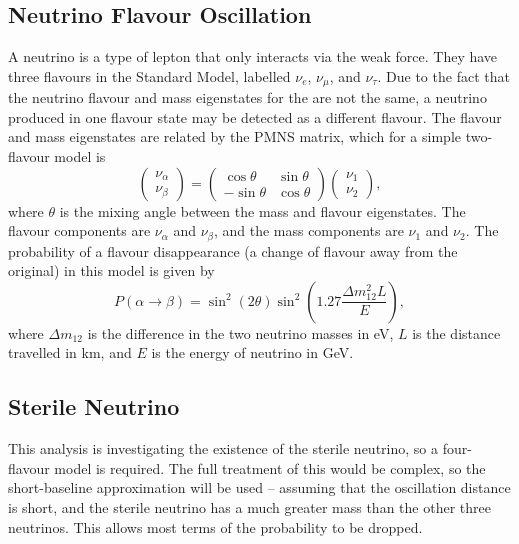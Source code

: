 \documentclass[reprint,
    nofootinbib,
    amsmath,amssymb,
    aps,
    10pt,
    nolongbibliography,
]{revtex4-2}
\begin{document}
\subsection{Neutrino Flavour Oscillation}

A neutrino is a type of lepton that only interacts via the weak force. They have three flavours in
the Standard Model, labelled $\nu_e$, $\nu_\mu$, and $\nu_\tau$. Due to the fact that the neutrino
flavour and mass eigenstates for the are not the same, a neutrino produced in one flavour state may be
detected as a different flavour. The flavour and mass eigenstates are related by the PMNS matrix\cite{pmns}, 
which for a simple two-flavour model is
\begin{equation}
    \begin{pmatrix}
        \nu_\alpha \\ \nu_\beta
    \end{pmatrix}
    = \begin{pmatrix}
        \cos{\theta} & \sin{\theta} \\
        -\sin{\theta} & \cos{\theta}
    \end{pmatrix} \begin{pmatrix}
        \nu_1 \\ \nu_2
    \end{pmatrix},
\end{equation}
where $\theta$ is the mixing angle between the mass and flavour eigenstates. The flavour components
are $\nu_\alpha$ and $\nu_\beta$, and the mass components are $\nu_1$ and $\nu_2$. The probability of a
flavour disappearance (a change of flavour away from the original) in this model is given by 
\begin{equation}
    P(\alpha \to \beta) = \sin^2{\left(2\theta\right)}\sin^2{\left(1.27 \frac{\Delta m_{12}^2 L}{E}\right)},
    \label{eqn:mixing_prob}
\end{equation}
where $\Delta m_{12}$ is the difference in the two neutrino masses in eV, $L$ is the distance
travelled in km, and $E$ is the energy of neutrino in GeV.

\pagebreak

\subsection{Sterile Neutrino}

This analysis is investigating the existence of the sterile neutrino, so a four-flavour model is
required. The full treatment of this would be complex, so the short-baseline approximation will be
used -- assuming that the oscillation distance is short, and the sterile neutrino has a much greater
mass than the other three neutrinos. This allows most terms of the probability to be dropped.\\
\end{document}
